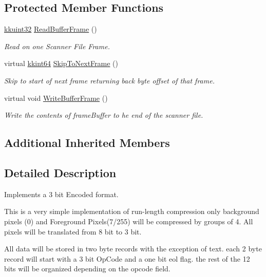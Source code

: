 \subsection*{Protected Member Functions}
\begin{DoxyCompactItemize}
\item 
\hyperlink{namespace_k_k_b_af8d832f05c54994a1cce25bd5743e19a}{kkuint32} \hyperlink{class_k_k_l_s_c_1_1_scanner_file3_bit_encoded_ab62fd19e8cdb7cda4e30477ea2b65158}{Read\+Buffer\+Frame} ()
\begin{DoxyCompactList}\small\item\em Read on one Scanner File Frame. \end{DoxyCompactList}\item 
virtual \hyperlink{namespace_k_k_b_aa3486b1c5ea9162b3b020c69f72826eb}{kkint64} \hyperlink{class_k_k_l_s_c_1_1_scanner_file3_bit_encoded_a7b4260b496c5b014ffcbc4c70955eac9}{Skip\+To\+Next\+Frame} ()
\begin{DoxyCompactList}\small\item\em Skip to start of next frame returning back byte offset of that frame. \end{DoxyCompactList}\item 
virtual void \hyperlink{class_k_k_l_s_c_1_1_scanner_file3_bit_encoded_ab6ef1007e883fd2d3f2a6cb6a91451fd}{Write\+Buffer\+Frame} ()
\begin{DoxyCompactList}\small\item\em Write the contents of \textquotesingle{}frame\+Buffer\textquotesingle{} to he end of the scanner file. \end{DoxyCompactList}\end{DoxyCompactItemize}
\subsection*{Additional Inherited Members}


\subsection{Detailed Description}
Implements a 3 bit Encoded format. 

This is a very simple implementation of run-\/length compression only background pixels (0) and Foreground Pixels(7/255) will be compressed by groups of 4. All pixels will be translated from 8 bit to 3 bit. 

All data will be stored in two byte records with the exception of text. each 2 byte record will start with a 3 bit Op\+Code and a one bit eol flag. the rest of the 12 bits will be organized depending on the opcode field. 


